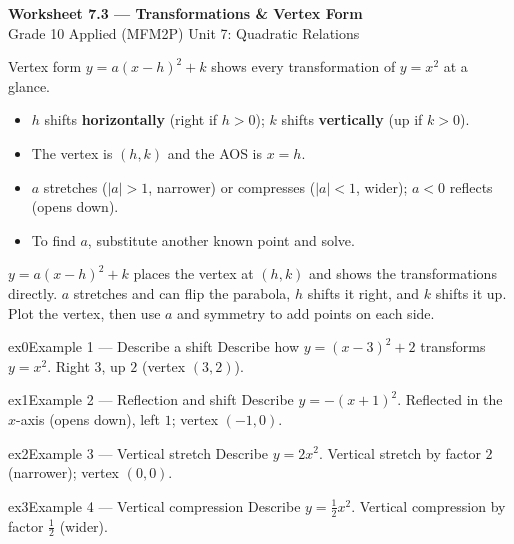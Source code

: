 \documentclass[11pt]{article}
\begin{document}
\begin{center}
{\LARGE\bfseries\color{titleblue}Worksheet 7.3 --- Transformations \& Vertex Form}\\[2pt]
{\small Grade 10 Applied (MFM2P) \textperiodcentered{} Unit 7: Quadratic Relations}
\end{center}

\begin{ideabox}
Vertex form $y=a(x-h)^2+k$ shows every transformation of $y=x^2$ at a glance.
\begin{itemize}[leftmargin=*,itemsep=2pt]
  \item $h$ shifts \textbf{horizontally} (right if $h>0$); $k$ shifts \textbf{vertically} (up if $k>0$).
  \item The vertex is $(h,k)$ and the AOS is $x=h$.
  \item $a$ stretches ($|a|>1$, narrower) or compresses ($|a|<1$, wider); $a<0$ reflects (opens down).
  \item To find $a$, substitute another known point and solve.
\end{itemize}
\end{ideabox}

\begin{learnbox}
$y=a(x-h)^2+k$ places the vertex at $(h,k)$ and shows the transformations directly.
$a$ stretches and can flip the parabola, $h$ shifts it right, and $k$ shifts it up.
Plot the vertex, then use $a$ and symmetry to add points on each side.
\end{learnbox}


\begin{example}{ex0}{Example 1 --- Describe a shift}
Describe how $y=(x-3)^2+2$ transforms $y=x^2$.
\soln Right $3$, up $2$ (vertex $(3,2)$).
\end{example}

\begin{example}{ex1}{Example 2 --- Reflection and shift}
Describe $y=-(x+1)^2$.
\soln Reflected in the $x$-axis (opens down), left $1$; vertex $(-1,0)$.
\end{example}

\begin{example}{ex2}{Example 3 --- Vertical stretch}
Describe $y=2x^2$.
\soln Vertical stretch by factor $2$ (narrower); vertex $(0,0)$.
\end{example}

\begin{example}{ex3}{Example 4 --- Vertical compression}
Describe $y=\tfrac12x^2$.
\soln Vertical compression by factor $\tfrac12$ (wider).
\end{example}
\end{document}
